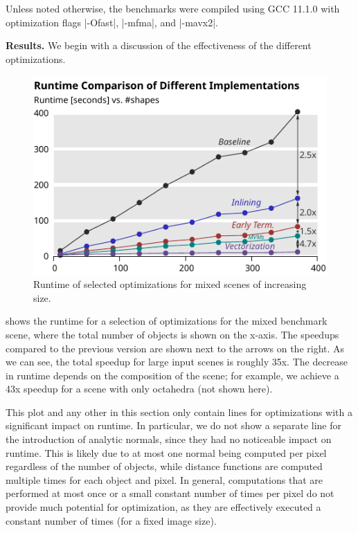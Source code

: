 \documentclass[letterpaper]{article}
\newcommand{\mypar}[1]{{\bf #1.}}
\begin{document}
Unless noted otherwise, the benchmarks were compiled using GCC 11.1.0 with optimization flags |-Ofast|, |-mfma|, and |-mavx2|.


\mypar{Results}
We begin with a discussion of the effectiveness of the different optimizations.

\begin{figure}[ht]
  \centering
  \includegraphics{Figures/rep-all-seconds.pdf}
  \caption{Runtime of selected optimizations for mixed scenes of increasing size.\label{fig:sec-all}}
\end{figure}

 shows the runtime for a selection of optimizations for the mixed benchmark scene, where the total number of objects is shown on the x-axis. The speedups compared to the previous version are shown next to the arrows on the right.
As we can see, the total speedup for large input scenes is roughly 35x.
The decrease in runtime depends on the composition of the scene; for example, we achieve a 43x speedup for a scene with only octahedra (not shown here).

This plot and any other in this section only contain lines for optimizations with a significant
impact on runtime.
In particular, we do not show a separate line for the introduction of analytic normals, since they had no noticeable impact on runtime.
This is likely due to at most one normal being computed per pixel regardless of the number of
objects, while distance functions are computed multiple times for each object and pixel.
In general, computations that are performed at most once or a small constant number of times per pixel
do not provide much potential for optimization, as they are effectively executed a constant number of times (for a fixed image size).
\end{document}
